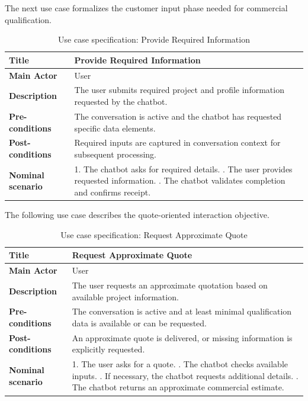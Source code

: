 \noindent The next use case formalizes the customer input phase needed for commercial qualification.
\begin{table}[H]
\centering
\caption{Use case specification: Provide Required Information}
\label{tab:uc-provide-required-information}
\begin{tabular}{|p{}|p{}|}
\hline
\textbf{Title} & Provide Required Information \\
\hline
\textbf{Main Actor} & User \\
\hline
\textbf{Description} & The user submits required project and profile information requested by the chatbot. \\
\hline
\textbf{Pre-conditions} & The conversation is active and the chatbot has requested specific data elements. \\
\hline
\textbf{Post-conditions} & Required inputs are captured in conversation context for subsequent processing. \\
\hline
\textbf{Nominal scenario} & 1. The chatbot asks for required details. \newline 2. The user provides requested information. \newline 3. The chatbot validates completion and confirms receipt. \\
\hline
\end{tabular}
\end{table}

\noindent The following use case describes the quote-oriented interaction objective.
\begin{table}[H]
\centering
\caption{Use case specification: Request Approximate Quote}
\label{tab:uc-request-approximate-quote}
\begin{tabular}{|p{}|p{}|}
\hline
\textbf{Title} & Request Approximate Quote \\
\hline
\textbf{Main Actor} & User \\
\hline
\textbf{Description} & The user requests an approximate quotation based on available project information. \\
\hline
\textbf{Pre-conditions} & The conversation is active and at least minimal qualification data is available or can be requested. \\
\hline
\textbf{Post-conditions} & An approximate quote is delivered, or missing information is explicitly requested. \\
\hline
\textbf{Nominal scenario} & 1. The user asks for a quote. \newline 2. The chatbot checks available inputs. \newline 3. If necessary, the chatbot requests additional details. \newline 4. The chatbot returns an approximate commercial estimate. \\
\hline
\end{tabular}
\end{table}

